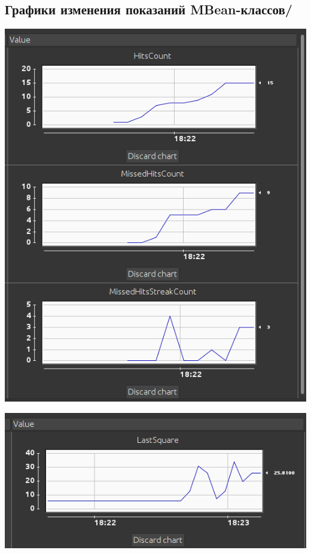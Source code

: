 \subsection{Графики изменения показаний MBean-классов/}
\includegraphics[scale=0.5]{img/Ex3pics/MetricsGraphics}\par
\includegraphics[scale=0.5]{img/Ex3pics/SquareMetrics}

\newpage

\thispagestyle{empty}


